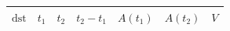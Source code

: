 \begin{tabular}{r r r r r r r}
\toprule
$\mathrm{dst}$ & $t_1$ & $t_2$ & $t_2-t_1$ & $A(t_1)$ & $A(t_2)$ & $V$ \\
\midrule
\bottomrule
\end{tabular}

